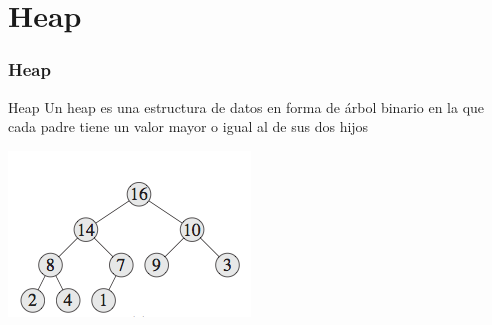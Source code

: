 \documentclass{beamer}
\begin{document}
\section{Heap}
	\begin{frame}
		\frametitle{Heap}
		\begin{block}{Heap}
			Un heap es una estructura de datos en forma de árbol binario en la que cada padre tiene un valor mayor o igual al de sus dos hijos
		\end{block}
		\begin{center}\includegraphics[height = 0.5\textheight]{heap.png} \end{center}
	\end{frame}
	
\end{document}

